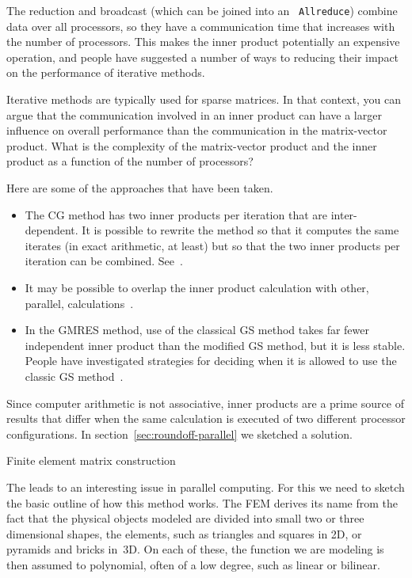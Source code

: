 The reduction and broadcast (which can be joined into an {\tt
  Allreduce}) combine data over all processors, so they have a
communication time that increases with the number of processors. This
makes the inner product potentially an expensive operation, and people
have suggested a number of ways to reducing their impact on the
performance of iterative methods.

\begin{exercise}
  Iterative methods are typically used for sparse matrices. In that
  context, you can argue that the communication involved in an inner product
  can have a larger influence on overall performance than the
  communication in the matrix-vector product. What is the
  complexity of the matrix-vector product and the inner product as a
  function of the number of processors?
\end{exercise}

Here are some of the approaches that have been taken.
\begin{itemize}
\item The \ac{CG} method has two inner products per iteration that are
  inter-dependent. It is possible to rewrite the method so that it
  computes the same iterates (in exact arithmetic, at least) but so
  that the two inner products per iteration can be
  combined. See~\cite{ChGe:sstep,DAzEijRo:ppscicomp,Me:multicg,YandBrent:bicgstab}.
\item It may be possible to overlap the inner product calculation with
  other, parallel, calculations~\cite{dehevo92:acta}.
\item In the \ac{GMRES} method, use of the classical \acf{GS}
  method takes far fewer independent inner product than the modified
  \ac{GS} method, but it is less stable. People have investigated strategies for deciding
  when it is allowed to use the classic \ac{GS} method~\cite{Langou:thesis}.
\end{itemize}

Since computer arithmetic is not associative, inner products are a prime
source of results that differ when the same calculation is executed of
two different processor configurations. In section~\ref{sec:roundoff-parallel}
we sketched a solution.


 {Finite element matrix construction}
\label{sec:fem-assembly}

The  leads to an interesting issue in parallel
computing. For this we need to sketch the basic outline of how this
method works. The \ac{FEM} derives its name from the fact that the
physical objects modeled are divided into small two or three
dimensional shapes, the elements, such as triangles and squares in 2D,
or pyramids and bricks in~3D. On each of these, the function we are
modeling is then assumed to polynomial, often of a low degree, such as
linear or bilinear.

